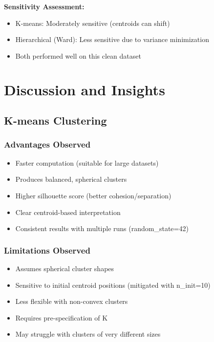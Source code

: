 \documentclass[12pt,a4paper]{article}
\begin{document}
\textbf{Sensitivity Assessment:}
\begin{itemize}
    \item K-means: Moderately sensitive (centroids can shift)
    \item Hierarchical (Ward): Less sensitive due to variance minimization
    \item Both performed well on this clean dataset
\end{itemize}

\newpage

\section{Discussion and Insights}

\subsection{K-means Clustering}

\subsubsection{Advantages Observed}
\begin{itemize}
    \item[$\checkmark$] Faster computation (suitable for large datasets)
    \item[$\checkmark$] Produces balanced, spherical clusters
    \item[$\checkmark$] Higher silhouette score (better cohesion/separation)
    \item[$\checkmark$] Clear centroid-based interpretation
    \item[$\checkmark$] Consistent results with multiple runs (random\_state=42)
\end{itemize}

\subsubsection{Limitations Observed}
\begin{itemize}
    \item[$\times$] Assumes spherical cluster shapes
    \item[$\times$] Sensitive to initial centroid positions (mitigated with n\_init=10)
    \item[$\times$] Less flexible with non-convex clusters
    \item[$\times$] Requires pre-specification of K
    \item[$\times$] May struggle with clusters of very different sizes
\end{itemize}
\end{document}
